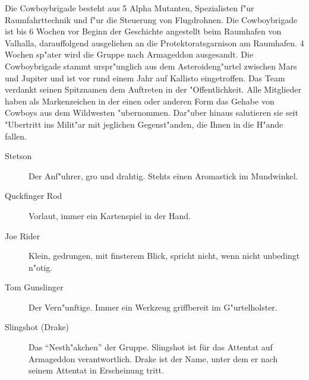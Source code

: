 
Die Cowboybrigade besteht aus 5 Alpha Mutanten, Spezialisten f"ur Raumfahrttechnik und f"ur die Steuerung von Flugdrohnen. 
Die Cowboybrigade ist bis 6 Wochen vor Beginn der Geschichte angestellt beim Raumhafen von Valhalla, darauffolgend ausgeliehen an die Protektoratsgarnison am Raumhafen. 4 Wochen sp"ater wird die Gruppe nach Armageddon ausgesandt. Die Cowboybrigade stammt urspr"unglich aus dem Asteroideng"urtel zwischen Mars und Jupiter und ist vor rund einem Jahr auf Kallisto eingetroffen. Das Team verdankt seinen Spitznamen dem Auftreten in der "Offentlichkeit. Alle Mitglieder haben als Markenzeichen in der einen oder anderen Form das Gehabe von Cowboys aus dem Wildwesten  "ubernommen. Dar"uber hinaus salutieren sie seit "Ubertritt ins Milit"ar mit jeglichen Gegenst"anden, die Ihnen in die H"ande fallen.

\begin{description}
    \item[Stetson] Der Anf"uhrer, gro\3 und drahtig. Stehts einen Aromastick im Mundwinkel.
    \item[Quckfinger Rod] Vorlaut, immer ein Kartenspiel in der Hand.
    \item[Joe Rider] Klein, gedrungen, mit finsterem Blick, spricht nicht, wenn nicht unbedingt n"otig.
    \item[Tom Gunslinger] Der Vern"unftige. Immer ein Werkzeug griffbereit im G"urtelholster. 
    \item[Slingshot (Drake)] Das "`Nesth"akchen"' der Gruppe. Slingshot ist für das Attentat auf Armageddon verantwortlich. 
        Drake ist der Name, unter dem er nach seinem Attentat in Erscheinung tritt.
\end{description}

\newpage
